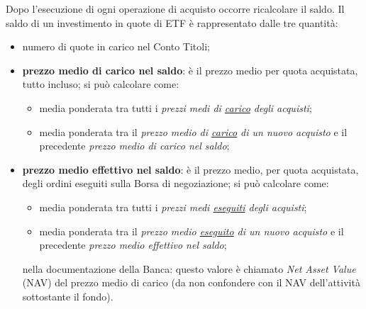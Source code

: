 \documentclass[12pt,a4paper]{article}
\begin{document}
Dopo l'esecuzione  di ogni operazione di  acquisto occorre ricalcolare il  saldo.  Il
saldo di un investimento in quote di ETF è rappresentato dalle tre quantità:
\begin{itemize}
\item numero di quote in carico nel Conto Titoli;
\item  \textbf{prezzo  medio di  carico  nel  saldo}: è  il  prezzo  medio per  quota
  acquistata, tutto incluso; si può calcolare come:
  \begin{itemize}
  \item media  ponderata tra  tutti i \emph{prezzi  medi di  \underline{carico} degli
       acquisti};
  \item media ponderata  tra il \emph{prezzo medio di \underline{carico}  di un nuovo
       acquisto} e il precedente \emph{prezzo medio di carico nel saldo};
  \end{itemize}
\item  \textbf{prezzo medio  effettivo  nel  saldo}: è  il  prezzo  medio, per  quota
  acquistata, degli  ordini eseguiti  sulla Borsa di  negoziazione; si  può calcolare
  come:
  \begin{itemize}
  \item  media ponderata  tra tutti  i \emph{prezzi  medi \underline{eseguiti}  degli
       acquisti};
  \item media  ponderata tra il  \emph{prezzo medio \underline{eseguito} di  un nuovo
       acquisto} e il precedente \emph{prezzo medio effettivo nel saldo};
  \end{itemize}
  nella documentazione della  Banca: questo valore è chiamato  \emph{Net Asset Value}
  (NAV)  del prezzo  medio di  carico  (da non  confondere con  il NAV  dell'attività
  sottostante il fondo).
\end{itemize}
\end{document}
